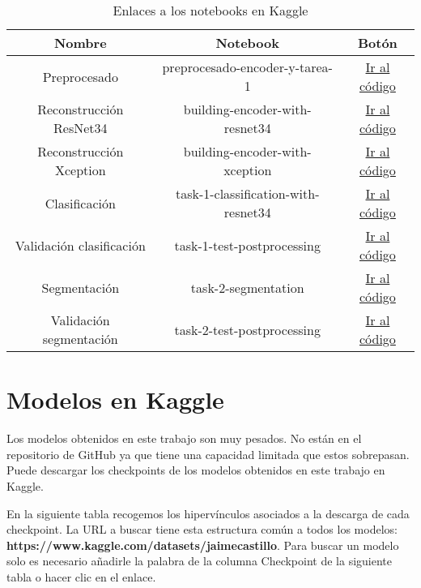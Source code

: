 \begin{table}[H]
	\centering
	\begin{tabular}{|ccc|}
		\toprule
		Nombre & Notebook & Botón \\
		\midrule
		Preprocesado & preprocesado-encoder-y-tarea-1 & \href{https://www.kaggle.com/code/jaimecastillo/preprocesado-encoder-y-tarea-1}{Ir al código} \\
		Reconstrucción ResNet34 & building-encoder-with-resnet34 & \href{https://www.kaggle.com/jaimecastillo/building-encoder-with-resnet34}{Ir al código} \\
		Reconstrucción Xception & building-encoder-with-xception & \href{https://www.kaggle.com/jaimecastillo/building-encoder-with-xception}{Ir al código}\\   
		Clasificación & task-1-classification-with-resnet34 & \href{https://www.kaggle.com/jaimecastillo/task-1-classification-with-resnet34}{Ir al código}  \\ 
		Validación clasificación & task-1-test-postprocessing & \href{https://www.kaggle.com/jaimecastillo/task-1-test-postprocessing}{Ir al código} \\
		Segmentación & task-2-segmentation & \href{https://www.kaggle.com/jaimecastillo/task-2-segmentation}{Ir al código}  \\ 
		Validación segmentación & task-2-test-postprocessing & \href{https://www.kaggle.com/jaimecastillo/task-2-test-postprocessing}{Ir al código} \\ 
		\bottomrule
	\end{tabular}
	\caption{Enlaces a los notebooks en Kaggle}
	\label{tabla:notebooksKaggle}
\end{table}

\section{Modelos en Kaggle}

Los modelos obtenidos en este trabajo son muy pesados. No están en el repositorio de GitHub ya que tiene una capacidad limitada que estos sobrepasan. Puede descargar los checkpoints de los modelos obtenidos en este trabajo en Kaggle.

En la siguiente tabla recogemos los hipervínculos asociados a la descarga de cada checkpoint. La URL a buscar tiene esta estructura común a todos los modelos: \textbf{https://www.kaggle.com/datasets/jaimecastillo}. Para buscar un modelo solo es necesario añadirle la palabra de la columna Checkpoint de la siguiente tabla o hacer clic en el enlace.

